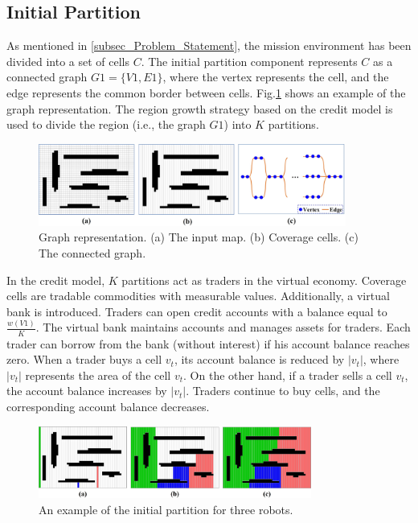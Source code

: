 \documentclass[journal,article,submit,pdftex,moreauthors]{Definitions/mdpi}
\begin{document}
\subsection{Initial Partition}

As mentioned in \ref{subsec_Problem_Statement}, the mission environment has been divided into a set of cells $C$. The initial partition component represents $C$ as a connected graph $G1 = \{V1,E1\}$, where the vertex represents the cell, and the edge represents the common border between cells. Fig.\ref{Fig_4} shows an example of the graph representation. The region growth strategy based on the credit model \cite{li2022complete} is used to divide the region (i.e., the graph $G1$) into $K$ partitions.

\begin{figure}[htb] %
	\centering  %
    \vspace{0 cm} %
    \includegraphics[width=0.9\textwidth]{4.jpg}
    \caption{ Graph representation. (a) The input map. (b) Coverage cells. (c) The connected graph.}
   \label{Fig_4}
\end{figure}

In the credit model, $K$ partitions act as traders in the virtual economy. Coverage cells are tradable commodities with measurable values. Additionally, a virtual bank is introduced. Traders can open credit accounts with a balance equal to $\frac{w(V1)}{K}$. The virtual bank maintains accounts and manages assets for traders. Each trader can borrow from the bank (without interest) if his account balance reaches zero. When a trader buys a cell $v_t$, its account balance is reduced by $|v_t|$, where $|v_t|$ represents the area of the cell $v_t$. On the other hand, if a trader sells a cell $v_t$, the account balance increases by $|v_t|$. Traders continue to buy cells, and the corresponding account balance decreases.

\begin{figure}[htb] %
	\centering  %
    \vspace{0 cm} %
    \includegraphics[width=0.8\textwidth]{5.jpg}
    \caption{An example of the initial partition for three robots.}
   \label{Fig_5}
\end{figure}
\end{document}
